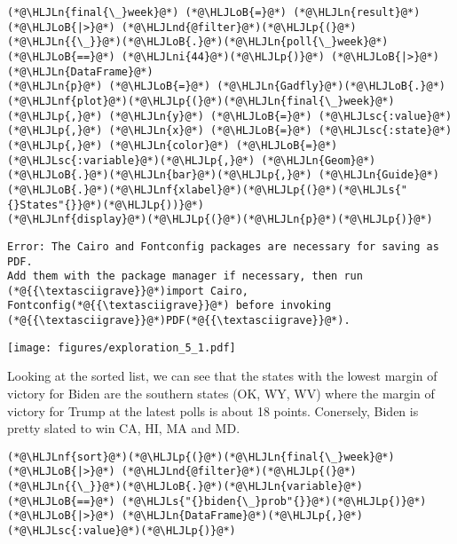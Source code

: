 \documentclass[12pt,a4paper]{article}
\newcommand{\HLJLn}[1]{#1}
\newcommand{\HLJLnd}[1]{\textcolor[RGB]{214,102,97}{#1}}
\newcommand{\HLJLnf}[1]{\textcolor[RGB]{66,102,213}{#1}}
\newcommand{\HLJLs}[1]{\textcolor[RGB]{201,61,57}{#1}}
\newcommand{\HLJLsc}[1]{\textcolor[RGB]{201,61,57}{#1}}
\newcommand{\HLJLni}[1]{\textcolor[RGB]{59,151,46}{#1}}
\newcommand{\HLJLoB}[1]{\textcolor[RGB]{102,102,102}{\textbf{#1}}}
\newcommand{\HLJLp}[1]{#1}
\begin{document}
\begin{lstlisting}
(*@\HLJLn{final{\_}week}@*) (*@\HLJLoB{=}@*) (*@\HLJLn{result}@*) (*@\HLJLoB{|>}@*) (*@\HLJLnd{@filter}@*)(*@\HLJLp{(}@*)(*@\HLJLn{{\_}}@*)(*@\HLJLoB{.}@*)(*@\HLJLn{poll{\_}week}@*) (*@\HLJLoB{==}@*) (*@\HLJLni{44}@*)(*@\HLJLp{)}@*) (*@\HLJLoB{|>}@*) (*@\HLJLn{DataFrame}@*)
(*@\HLJLn{p}@*) (*@\HLJLoB{=}@*) (*@\HLJLn{Gadfly}@*)(*@\HLJLoB{.}@*)(*@\HLJLnf{plot}@*)(*@\HLJLp{(}@*)(*@\HLJLn{final{\_}week}@*)(*@\HLJLp{,}@*) (*@\HLJLn{y}@*) (*@\HLJLoB{=}@*) (*@\HLJLsc{:value}@*)(*@\HLJLp{,}@*) (*@\HLJLn{x}@*) (*@\HLJLoB{=}@*) (*@\HLJLsc{:state}@*)(*@\HLJLp{,}@*) (*@\HLJLn{color}@*) (*@\HLJLoB{=}@*) (*@\HLJLsc{:variable}@*)(*@\HLJLp{,}@*) (*@\HLJLn{Geom}@*)(*@\HLJLoB{.}@*)(*@\HLJLn{bar}@*)(*@\HLJLp{,}@*) (*@\HLJLn{Guide}@*)(*@\HLJLoB{.}@*)(*@\HLJLnf{xlabel}@*)(*@\HLJLp{(}@*)(*@\HLJLs{"{}States"{}}@*)(*@\HLJLp{))}@*)
(*@\HLJLnf{display}@*)(*@\HLJLp{(}@*)(*@\HLJLn{p}@*)(*@\HLJLp{)}@*)
\end{lstlisting}

\begin{lstlisting}
Error: The Cairo and Fontconfig packages are necessary for saving as PDF.
Add them with the package manager if necessary, then run (*@{{\textasciigrave}}@*)import Cairo,
Fontconfig(*@{{\textasciigrave}}@*) before invoking (*@{{\textasciigrave}}@*)PDF(*@{{\textasciigrave}}@*).
\end{lstlisting}

\texttt{[image: figures/exploration\_5\_1.pdf]}

Looking at the sorted list, we can see that the states with the lowest margin of victory for Biden are the southern states (OK, WY, WV) where the margin of victory for Trump at the latest polls is about 18 points. Conersely, Biden is pretty slated to win CA, HI, MA and MD.  


\begin{lstlisting}
(*@\HLJLnf{sort}@*)(*@\HLJLp{(}@*)(*@\HLJLn{final{\_}week}@*) (*@\HLJLoB{|>}@*) (*@\HLJLnd{@filter}@*)(*@\HLJLp{(}@*)(*@\HLJLn{{\_}}@*)(*@\HLJLoB{.}@*)(*@\HLJLn{variable}@*) (*@\HLJLoB{==}@*) (*@\HLJLs{"{}biden{\_}prob"{}}@*)(*@\HLJLp{)}@*) (*@\HLJLoB{|>}@*) (*@\HLJLn{DataFrame}@*)(*@\HLJLp{,}@*) (*@\HLJLsc{:value}@*)(*@\HLJLp{)}@*)
\end{lstlisting}
\end{document}
